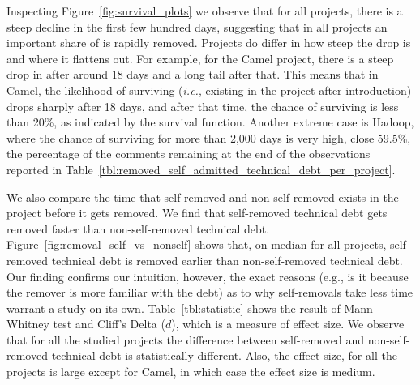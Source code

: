 Inspecting Figure~\ref{fig:survival_plots} we observe that for all projects, there is a steep decline in the first few hundred days, suggesting that in all projects an important share of \SATD is rapidly removed. Projects do differ in how steep the drop is and where it flattens out. For example, for the Camel project, there is a steep drop in \SATD after around 18 days and a long tail after that. This means that in Camel, the likelihood of \SATD surviving (\emph{i.e.}, existing in the project after introduction) drops sharply after 18 days, and after that time, the chance of surviving is less than 20\%, as indicated by the survival function. Another extreme case is Hadoop, where the chance of \SATD surviving for more than 2,000 days is very high, close 59.5\%, the percentage
of the \SATD comments remaining at the end of the observations reported in Table~\ref{tbl:removed_self_admitted_technical_debt_per_project}. 


We also compare the time that self-removed and non-self-removed \SATD exists in the project before it gets removed. We find that self-removed technical debt gets removed faster than non-self-removed technical debt. Figure~\ref{fig:removal_self_vs_nonself} shows that, on median for all projects, self-removed technical debt is removed earlier than non-self-removed technical debt. Our finding confirms our intuition, however, the exact reasons (e.g., is it because the remover is more familiar with the debt) as to why self-removals take less time warrant a study on its own. Table~\ref{tbl:statistic} shows the result of  Mann-Whitney test and Cliff's Delta ($d$), which is a measure of effect size. We observe that for all the studied projects the difference between self-removed and non-self-removed technical debt is statistically different. Also, the effect size, for all the projects is large except for Camel, in which case the effect size is medium.





